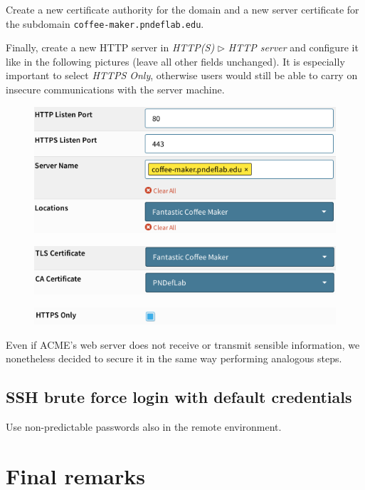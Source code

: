 \documentclass[draft]{homework}
\begin{document}
    Create a new certificate authority for the domain and a new server certificate for the subdomain \texttt{coffee-maker.pndeflab.edu}.
    
    Finally, create a new HTTP server in \textit{HTTP(S)} $\triangleright$ \textit{HTTP server} and configure it like in the following pictures (leave all other fields unchanged).
    It is especially important to select \textit{HTTPS Only}, otherwise users would still be able to carry on insecure communications with the server machine.
    \vspace{-5pt}
    \begin{figure}[H]
        \centering
        \includegraphics[width=1\linewidth]{images/http-server-1}
        \label{fig:http-server-1}
    \end{figure}
    \vspace{-20pt}
    \begin{figure}[H]
        \centering
        \includegraphics[width=1\linewidth]{images/http-server-2}
        \label{fig:http-server-2}
    \end{figure}
    \vspace{-20pt}
    \begin{figure}[H]
        \centering
        \includegraphics[width=1\linewidth]{images/http-server-3}
        \label{fig:http-server-3}
    \end{figure}
    \vspace{-20pt}
    
    Even if ACME's web server does not receive or transmit sensible information, we nonetheless decided to secure it in the same way performing analogous steps.
    
    \subsection{SSH brute force login with default credentials}
    Use non-predictable passwords also in the remote environment.
    
    
    \section{Final remarks}
\end{document}
